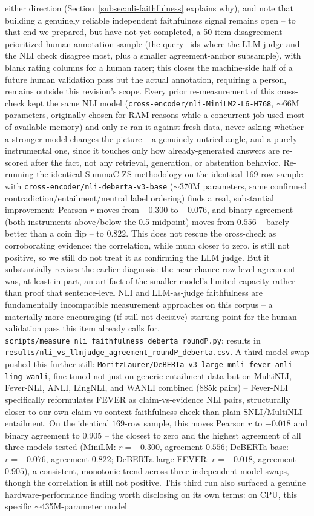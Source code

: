 \documentclass[a4paper,twoside]{article}
\begin{document}
either direction (Section~\ref{subsec:nli-faithfulness} explains why), and note that building a genuinely reliable independent faithfulness signal remains open -- to that end we prepared, but have not yet completed, a 50-item disagreement-prioritized human annotation sample (the query\_ids where the LLM judge and the NLI check disagree most, plus a smaller agreement-anchor subsample), with blank rating columns for a human rater; this closes the machine-side half of a future human validation pass but the actual annotation, requiring a person, remains outside this revision's scope. Every prior re-measurement of this cross-check kept the same NLI model (\texttt{cross-encoder/nli-MiniLM2-L6-H768}, $\sim$66M parameters, originally chosen for RAM reasons while a concurrent job used most of available memory) and only re-ran it against fresh data, never asking whether a stronger model changes the picture -- a genuinely untried angle, and a purely instrumental one, since it touches only how already-generated answers are re-scored after the fact, not any retrieval, generation, or abstention behavior. Re-running the identical SummaC-ZS methodology on the identical 169-row sample with \texttt{cross-encoder/nli-deberta-v3-base} ($\sim$370M parameters, same confirmed contradiction/entailment/neutral label ordering) finds a real, substantial improvement: Pearson $r$ moves from $-0.300$ to $-0.076$, and binary agreement (both instruments above/below the 0.5 midpoint) moves from $0.556$ -- barely better than a coin flip -- to $0.822$. This does not rescue the cross-check as corroborating evidence: the correlation, while much closer to zero, is still not positive, so we still do not treat it as confirming the LLM judge. But it substantially revises the earlier diagnosis: the near-chance row-level agreement was, at least in part, an artifact of the smaller model's limited capacity rather than proof that sentence-level NLI and LLM-as-judge faithfulness are fundamentally incompatible measurement approaches on this corpus -- a materially more encouraging (if still not decisive) starting point for the human-validation pass this item already calls for. \texttt{scripts/measure\_nli\_faithfulness\_deberta\_roundP.py}; results in \texttt{results/nli\_vs\_llmjudge\_agreement\_roundP\_deberta.csv}. A third model swap pushed this further still: \texttt{MoritzLaurer/DeBERTa-v3-large-mnli-fever-anli-ling-wanli}, fine-tuned not just on generic entailment data but on MultiNLI, Fever-NLI, ANLI, LingNLI, and WANLI combined ($885$k pairs) -- Fever-NLI specifically reformulates FEVER \citep{thorne2018fever} as claim-vs-evidence NLI pairs, structurally closer to our own claim-vs-context faithfulness check than plain SNLI/MultiNLI entailment. On the identical $169$-row sample, this moves Pearson $r$ to $-0.018$ and binary agreement to $0.905$ -- the closest to zero and the highest agreement of all three models tested (MiniLM: $r=-0.300$, agreement $0.556$; DeBERTa-base: $r=-0.076$, agreement $0.822$; DeBERTa-large-FEVER: $r=-0.018$, agreement $0.905$), a consistent, monotonic trend across three independent model swaps, though the correlation is still not positive. This third run also surfaced a genuine hardware-performance finding worth disclosing on its own terms: on CPU, this specific $\sim$435M-parameter model 
\end{document}
